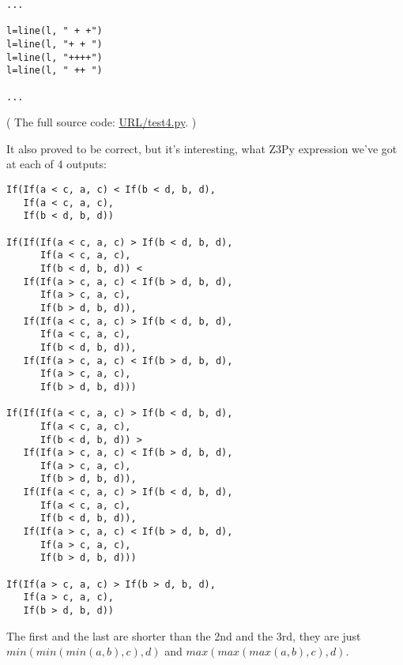 \begin{lstlisting}
...

l=line(l, " + +")
l=line(l, "+ + ")
l=line(l, "++++")
l=line(l, " ++ ")

...
\end{lstlisting}

( The full source code: \url{URL/test4.py}. )

It also proved to be correct, but it's interesting, what Z3Py expression we've got at each of 4 outputs:

\begin{lstlisting}
If(If(a < c, a, c) < If(b < d, b, d),
   If(a < c, a, c),
   If(b < d, b, d))

If(If(If(a < c, a, c) > If(b < d, b, d),
      If(a < c, a, c),
      If(b < d, b, d)) <
   If(If(a > c, a, c) < If(b > d, b, d),
      If(a > c, a, c),
      If(b > d, b, d)),
   If(If(a < c, a, c) > If(b < d, b, d),
      If(a < c, a, c),
      If(b < d, b, d)),
   If(If(a > c, a, c) < If(b > d, b, d),
      If(a > c, a, c),
      If(b > d, b, d)))

If(If(If(a < c, a, c) > If(b < d, b, d),
      If(a < c, a, c),
      If(b < d, b, d)) >
   If(If(a > c, a, c) < If(b > d, b, d),
      If(a > c, a, c),
      If(b > d, b, d)),
   If(If(a < c, a, c) > If(b < d, b, d),
      If(a < c, a, c),
      If(b < d, b, d)),
   If(If(a > c, a, c) < If(b > d, b, d),
      If(a > c, a, c),
      If(b > d, b, d)))

If(If(a > c, a, c) > If(b > d, b, d),
   If(a > c, a, c),
   If(b > d, b, d))
\end{lstlisting}

The first and the last are shorter than the 2nd and the 3rd, they are just
$min(min(min(a,b),c),d)$ and 
$max(max(max(a,b),c),d)$.

